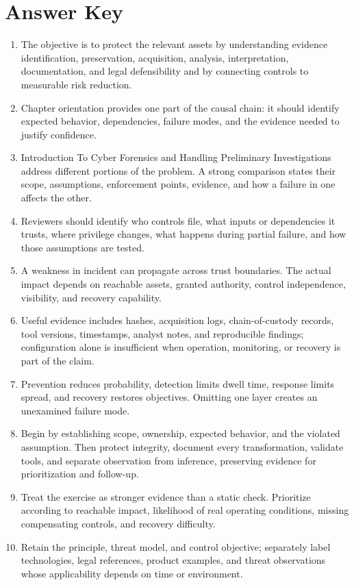 \documentclass[11pt,letterpaper]{article}
\begin{document}
\section*{Answer Key}
\begin{enumerate}
\item The objective is to protect the relevant assets by understanding evidence identification, preservation, acquisition, analysis, interpretation, documentation, and legal defensibility and by connecting controls to measurable risk reduction.
\item Chapter orientation provides one part of the causal chain: it should identify expected behavior, dependencies, failure modes, and the evidence needed to justify confidence.
\item Introduction To Cyber Forensics and Handling Preliminary Investigations address different portions of the problem. A strong comparison states their scope, assumptions, enforcement points, evidence, and how a failure in one affects the other.
\item Reviewers should identify who controls file, what inputs or dependencies it trusts, where privilege changes, what happens during partial failure, and how those assumptions are tested.
\item A weakness in incident can propagate across trust boundaries. The actual impact depends on reachable assets, granted authority, control independence, visibility, and recovery capability.
\item Useful evidence includes hashes, acquisition logs, chain-of-custody records, tool versions, timestamps, analyst notes, and reproducible findings; configuration alone is insufficient when operation, monitoring, or recovery is part of the claim.
\item Prevention reduces probability, detection limits dwell time, response limits spread, and recovery restores objectives. Omitting one layer creates an unexamined failure mode.
\item Begin by establishing scope, ownership, expected behavior, and the violated assumption. Then protect integrity, document every transformation, validate tools, and separate observation from inference, preserving evidence for prioritization and follow-up.
\item Treat the exercise as stronger evidence than a static check. Prioritize according to reachable impact, likelihood of real operating conditions, missing compensating controls, and recovery difficulty.
\item Retain the principle, threat model, and control objective; separately label technologies, legal references, product examples, and threat observations whose applicability depends on time or environment.
\end{enumerate}
\end{document}
